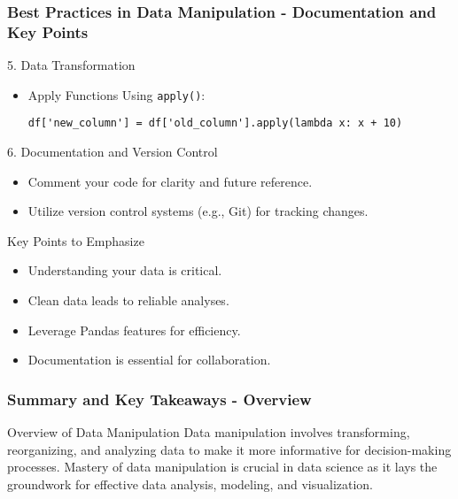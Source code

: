 \documentclass[aspectratio=169]{beamer}
\begin{document}
\begin{frame}[fragile]
  \frametitle{Best Practices in Data Manipulation - Documentation and Key Points}
  
  \begin{block}{5. Data Transformation}
      \begin{itemize}
          \item Apply Functions Using \texttt{apply()}:
          \begin{lstlisting}
df['new_column'] = df['old_column'].apply(lambda x: x + 10)
          \end{lstlisting}
      \end{itemize}
  \end{block}
  
  \begin{block}{6. Documentation and Version Control}
      \begin{itemize}
          \item Comment your code for clarity and future reference.
          \item Utilize version control systems (e.g., Git) for tracking changes.
      \end{itemize}
  \end{block}
  
  \begin{block}{Key Points to Emphasize}
      \begin{itemize}
          \item Understanding your data is critical.
          \item Clean data leads to reliable analyses.
          \item Leverage Pandas features for efficiency.
          \item Documentation is essential for collaboration.
      \end{itemize}
  \end{block}
  
\end{frame}

\begin{frame}[fragile]
    \frametitle{Summary and Key Takeaways - Overview}
    \begin{block}{Overview of Data Manipulation}
        Data manipulation involves transforming, reorganizing, and analyzing data to make it more informative for decision-making processes. Mastery of data manipulation is crucial in data science as it lays the groundwork for effective data analysis, modeling, and visualization.
    \end{block}
\end{frame}
\end{document}
